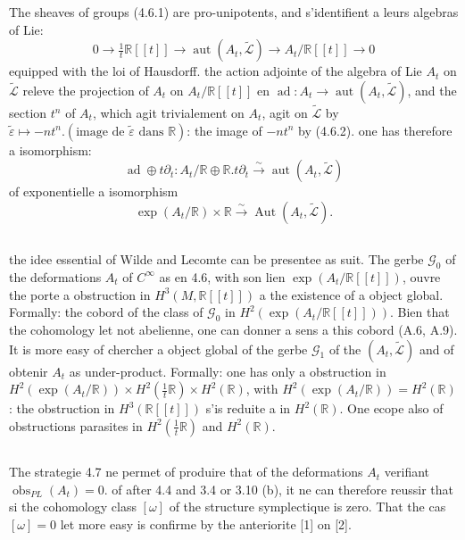 \documentclass[11pt,a4paper]{article}
\theoremstyle{plain}
\theoremstyle{definition}
\DeclareMathOperator{\Aut}{Aut}
\DeclareMathOperator{\aut}{aut}
\DeclareMathOperator{\ad}{ad}
\DeclareMathOperator{\obs}{obs}
\newcommand{\R}{\mathbb{R}}
\newcommand{\iso}{\xrightarrow{\sim}}
\begin{document}
The sheaves of groups (4.6.1) are pro-unipotents, and s'identifient a leurs algebras of Lie:
\begin{equation}
0 \longrightarrow \tfrac{1}{t}\R[[t]] \longrightarrow \aut(A_{t}, \widetilde{\mathcal{L}}) \longrightarrow A_{t}/\R[[t]] \longrightarrow 0 \tag{4.6.2}
\end{equation}
equipped with the loi of Hausdorff. the action adjointe of the algebra of Lie $A_{t}$ on $\widetilde{\mathcal{L}}$ releve the projection of $A_{t}$ on $A_{t}/\R[[t]]$ en $\ad: A_{t} \to \aut(A_{t}, \widetilde{\mathcal{L}})$, and the section $t^{n}$ of $A_{t}$, which agit trivialement on $A_{t}$, agit on $\widetilde{\mathcal{L}}$ by $\tilde{\varepsilon} \mapsto -nt^{n}.(\text{image de } \tilde{\varepsilon} \text{ dans } \R)$: the image of $-nt^{n}$ by (4.6.2). one has therefore a isomorphism:
\[
\ad \oplus t\partial_{t}: A_{t}/\R \oplus \R.t\partial_{t} \iso \aut(A_{t}, \widetilde{\mathcal{L}})
\]
of exponentielle a isomorphism
\begin{equation}
\exp(A_{t}/\R) \times \R \iso \Aut(A_{t}, \widetilde{\mathcal{L}}). \tag{4.6.3}
\end{equation}

\subsection{}
the idee essential of Wilde and Lecomte can be presentee as suit.
The gerbe $\mathcal{G}_{0}$ of the deformations $A_{t}$ of $C^{\infty}$ as en 4.6, with son lien $\exp(A_{t}/\R[[t]])$,
ouvre the porte a obstruction in $H^{3}(M, \R[[t]])$ a the existence of a object global.
Formally: the cobord of the class of $\mathcal{G}_{0}$ in $H^{2}(\exp(A_{t}/\R[[t]]))$. Bien that the cohomology let not abelienne, one can donner a sens a this cobord (A.6, A.9). It is more easy of chercher a object global of the gerbe $\mathcal{G}_{1}$ of the $(A_{t}, \widetilde{\mathcal{L}})$ and of obtenir $A_{t}$ as under-product. Formally: one has only a obstruction in $H^{2}(\exp(A_{t}/\R)) \times H^{2}(\tfrac{1}{t}\R) \times H^{2}(\R)$, with $H^{2}(\exp(A_{t}/\R)) = H^{2}(\R)$: the obstruction in $H^{3}(\R[[t]])$ s'is reduite a in $H^{2}(\R)$. One ecope also of obstructions parasites in $H^{2}(\tfrac{1}{t}\R)$ and $H^{2}(\R)$.

\subsection{}
The strategie 4.7 ne permet of produire that of the deformations $A_{t}$ verifiant $\obs_{PL}(A_{t}) = 0$. of after 4.4 and 3.4 or 3.10 (b), it ne can therefore reussir that si the cohomology class $[\omega]$ of the structure symplectique is zero. That the cas $[\omega] = 0$
let more easy is confirme by the anteriorite [1] on [2].
\end{document}
